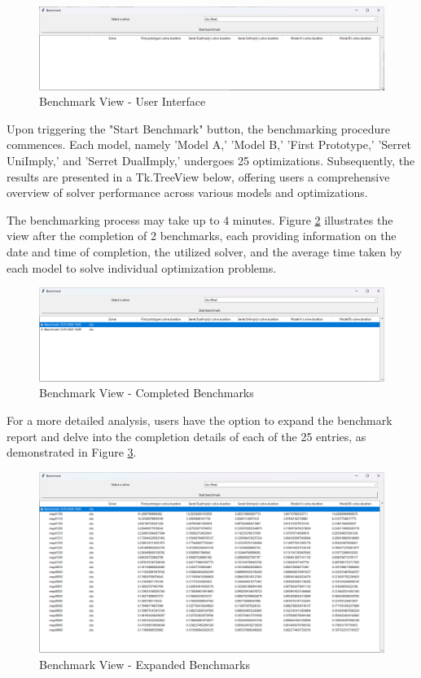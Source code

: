\begin{figure} [H]
\centering
\includegraphics[width=0.8\linewidth]{Design of the User Interface/benchmark_View.png}
\caption{Benchmark View - User Interface}
\label{fig:benchmark-view}
\end{figure}

Upon triggering the "Start Benchmark" button, the benchmarking procedure commences. Each model, namely 'Model A,' 'Model B,' 'First Prototype,' 'Serret UniImply,' and 'Serret DualImply,' undergoes 25 optimizations. Subsequently, the results are presented in a Tk.TreeView below, offering users a comprehensive overview of solver performance across various models and optimizations.

The benchmarking process may take up to 4 minutes. Figure \ref{fig:benchmark-2-completed} illustrates the view after the completion of 2 benchmarks, each providing information on the date and time of completion, the utilized solver, and the average time taken by each model to solve individual optimization problems.

\begin{figure} [H]
\centering
\includegraphics[width=0.75\linewidth]{Design of the User Interface/benchmark_2_completed.png}
\caption{Benchmark View - Completed Benchmarks}
\label{fig:benchmark-2-completed}
\end{figure}

For a more detailed analysis, users have the option to expand the benchmark report and delve into the completion details of each of the 25 entries, as demonstrated in Figure \ref{fig:expanded_benchmark}.

\begin{figure} [H]
\centering
\includegraphics[width=0.75\linewidth]{benchmark_expanded.png}
\caption{Benchmark View - Expanded Benchmarks}
\label{fig:expanded_benchmark}
\end{figure}